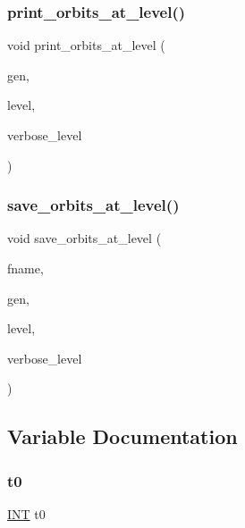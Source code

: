 \subsubsection{\texorpdfstring{print\+\_\+orbits\+\_\+at\+\_\+level()}{print\_orbits\_at\_level()}}
{\footnotesize\ttfamily void print\+\_\+orbits\+\_\+at\+\_\+level (\begin{DoxyParamCaption}\item[{\mbox{\hyperlink{classgenerator}{generator}} $\ast$}]{gen,  }\item[{\mbox{\hyperlink{galois_8h_a09fddde158a3a20bd2dcadb609de11dc}{I\+NT}}}]{level,  }\item[{\mbox{\hyperlink{galois_8h_a09fddde158a3a20bd2dcadb609de11dc}{I\+NT}}}]{verbose\+\_\+level }\end{DoxyParamCaption})}

\mbox{\label{all__cliques_8_c_aba6adc5644e3eac81e1d30c31c284d40}} 
\subsubsection{\texorpdfstring{save\+\_\+orbits\+\_\+at\+\_\+level()}{save\_orbits\_at\_level()}}
{\footnotesize\ttfamily void save\+\_\+orbits\+\_\+at\+\_\+level (\begin{DoxyParamCaption}\item[{const \mbox{\hyperlink{galois_8h_ab6cc7b4aeb6ea31aba2b3fbfc83ff5e6}{B\+Y\+TE}} $\ast$}]{fname,  }\item[{\mbox{\hyperlink{classgenerator}{generator}} $\ast$}]{gen,  }\item[{\mbox{\hyperlink{galois_8h_a09fddde158a3a20bd2dcadb609de11dc}{I\+NT}}}]{level,  }\item[{\mbox{\hyperlink{galois_8h_a09fddde158a3a20bd2dcadb609de11dc}{I\+NT}}}]{verbose\+\_\+level }\end{DoxyParamCaption})}



\subsection{Variable Documentation}
\mbox{\label{all__cliques_8_c_a4268f4fe222ffb119218a0199f5e1904}} 
\subsubsection{\texorpdfstring{t0}{t0}}
{\footnotesize\ttfamily \mbox{\hyperlink{galois_8h_a09fddde158a3a20bd2dcadb609de11dc}{I\+NT}} t0}

